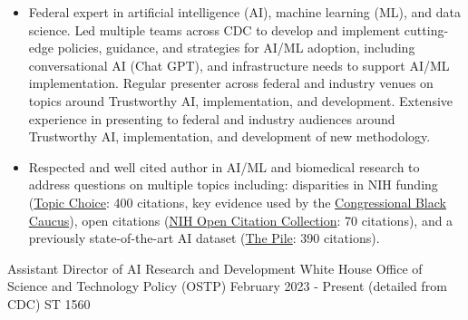 \documentclass[]{scrartcl}
\begin{document}
\begin{cleanCV}

   \vspace{-1em}

   {
  \vspace{-0.25em}
  \begin{itemize}

  \item Federal expert in artificial intelligence (AI), machine learning (ML), and data science. Led multiple teams across CDC to develop and implement cutting-edge policies, guidance, and strategies for AI/ML adoption, including conversational AI (Chat GPT), and infrastructure needs to support AI/ML implementation. Regular presenter across federal and industry venues on topics around Trustworthy AI, implementation, and development. Extensive experience in presenting to federal and industry audiences around Trustworthy AI, implementation, and development of new methodology.

   \item Respected and well cited author in AI/ML and biomedical research to address questions on multiple topics including: disparities in NIH funding (\href{https://www.science.org/doi/10.1126/sciadv.aaw7238}{Topic Choice}: 400 citations, key evidence used by the \href{https://bluntrochester.house.gov/uploadedfiles/191220_ltr_to_nih_about_grant_disparities.pdf}{Congressional Black Caucus}), open citations (\href{https://www.ncbi.nlm.nih.gov/pmc/articles/PMC6786512/}{NIH Open Citation Collection}: 70 citations), and a previously state-of-the-art AI dataset (\href{https://arxiv.org/abs/2101.00027}{The Pile}: 390 citations).

  \end{itemize}
}

  \vspace{-1em}

\WorkExperience
{}
{Assistant Director of AI Research and Development}
{
  \newline White House Office of Science and Technology Policy (OSTP)
  \newline February 2023 - Present (detailed from CDC)
  \newline ST 1560
}
{
  \vspace{-0.25em}
  \begin{itemize}


\end{itemize}}
\end{cleanCV}
\end{document}

